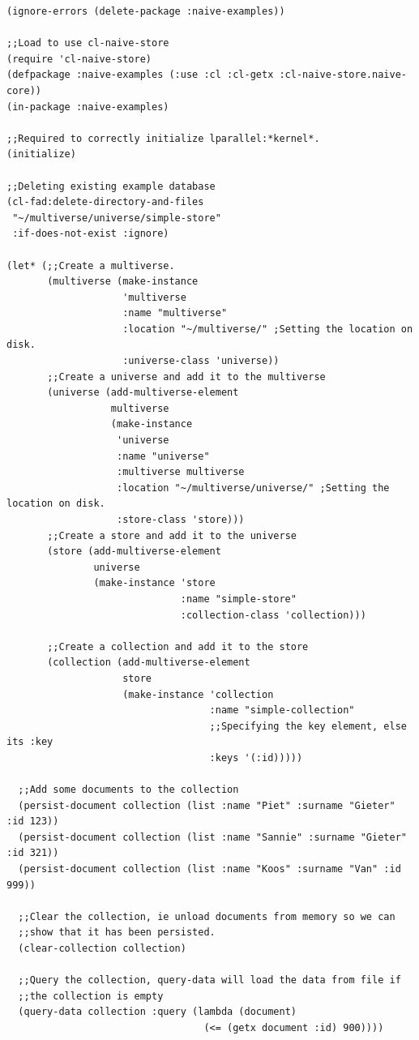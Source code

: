 \documentclass[11pt]{article}
\begin{document}
\begin{verbatim}
(ignore-errors (delete-package :naive-examples))

;;Load to use cl-naive-store
(require 'cl-naive-store)
(defpackage :naive-examples (:use :cl :cl-getx :cl-naive-store.naive-core))
(in-package :naive-examples)

;;Required to correctly initialize lparallel:*kernel*.
(initialize)

;;Deleting existing example database
(cl-fad:delete-directory-and-files
 "~/multiverse/universe/simple-store"
 :if-does-not-exist :ignore)

(let* (;;Create a multiverse.
       (multiverse (make-instance
                    'multiverse
                    :name "multiverse"
                    :location "~/multiverse/" ;Setting the location on disk.
                    :universe-class 'universe))
       ;;Create a universe and add it to the multiverse
       (universe (add-multiverse-element
                  multiverse
                  (make-instance
                   'universe
                   :name "universe"
                   :multiverse multiverse
                   :location "~/multiverse/universe/" ;Setting the location on disk.
                   :store-class 'store)))
       ;;Create a store and add it to the universe
       (store (add-multiverse-element
               universe
               (make-instance 'store
                              :name "simple-store"
                              :collection-class 'collection)))

       ;;Create a collection and add it to the store
       (collection (add-multiverse-element
                    store
                    (make-instance 'collection
                                   :name "simple-collection"
                                   ;;Specifying the key element, else its :key
                                   :keys '(:id)))))

  ;;Add some documents to the collection
  (persist-document collection (list :name "Piet" :surname "Gieter" :id 123))
  (persist-document collection (list :name "Sannie" :surname "Gieter" :id 321))
  (persist-document collection (list :name "Koos" :surname "Van" :id 999))

  ;;Clear the collection, ie unload documents from memory so we can
  ;;show that it has been persisted.
  (clear-collection collection)

  ;;Query the collection, query-data will load the data from file if
  ;;the collection is empty
  (query-data collection :query (lambda (document)
                                  (<= (getx document :id) 900))))
\end{verbatim}
\end{document}
